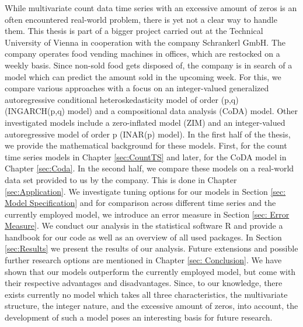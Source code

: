 While multivariate count data time series with an excessive amount of zeros is an often encountered real-world problem, there is yet not a clear way to handle them. This thesis is part of a bigger project carried out at the Technical University of Vienna in cooperation with the company Schrankerl GmbH. The company operates food vending machines in offices, which are restocked on a weekly basis. Since non-sold food gets disposed of, the company is in search of a model which can predict the amount sold in the upcoming week. For this, we compare various approaches with a focus on an integer-valued generalized autoregressive conditional heteroskedasticity model of order (p,q) (INGARCH(p,q) model) and a compositional data analysis (CoDA) model. Other investigated models include a zero-inflated model (ZIM) and an integer-valued autoregressive model of order p (INAR(p) model). In the first half of the thesis, we provide the mathematical background for these models. First, for the count time series models in Chapter \ref{sec:CountTS} and later, for the CoDA model in Chapter \ref{sec:Coda}. In the second half, we compare these models on a real-world data set provided to us by the company. This is done in Chapter \ref{sec:Application}. We investigate tuning options for our models in Section \ref{sec: Model Specification} and for comparison across different time series and the currently employed model, we introduce an error measure in Section \ref{sec: Error Measure}. We conduct our analysis in the statistical software R and provide a handbook for our code as well as an overview of all used packages. In Section \ref{sec:Results} we present the results of our analysis. Future extensions and possible further research options are mentioned in Chapter \ref{sec: Conclusion}. We have shown that our models outperform the currently employed model, but come with their respective advantages and disadvantages. Since, to our knowledge, there exists currently no model which takes all three characteristics, the multivariate structure, the integer nature, and the excessive amount of zeros, into account, the development of such a model poses an interesting basis for future research.

